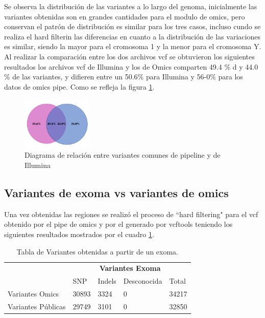 Se observa la distribución de las variantes a lo largo del genoma, inicialmente las variantes obtenidas son en grandes cantidades para el modulo de omics, pero conservan el patrón de distribución es similar para los tres casos, incluso cundo se realiza el hard filterin las diferencias en cuanto a la distribución de las variaciones es similar, siendo la mayor para el cromosoma 1 y la menor para el cromosoma Y. \\

Al realizar la comparación entre los dos archivos vcf se obtuvieron los siguientes resultados los archivos vcf de Illumina y los de Omics comparten 49.4 \% d y 44.0 \% de las variantes, y difieren entre un 50.6\% para Illumina y 56-0\% para los datos de omics pipe. Como se refleja la figura \ref{fig:diagrama}. \\

\begin{figure}[]
	\centering
	\includegraphics[width=0.3\textwidth]{Kap2/validacion2}
	\caption{Diagrama de relación entre variantes comunes de pipeline y de Illumina} \label{fig:diagrama}
\end{figure}

\subsection*{Variantes de exoma vs variantes de omics}

Una vez obtenidas las regiones se realizó el proceso de ``hard filtering" para el vcf obtenido por el pipe de omics y por el generado por vcftools teniendo los siguientes resultados mostrados por el cuadro \ref{tabla:tabla2}. \\

\begin{table}[H]
	\centering  
	\begin{tabular}{|l|l|l|l|l|}
		\hline
		& \multicolumn{4}{c|}{\textbf{Variantes Exoma}} \\
		\cline{2-5} 
		& SNP  & Indels & Desconocida & Total \\ \cline{2-5}
		\hline 
		\multirow{1}{4cm}{Variantes Omics} & 30893 & 3324 & 0 & 34217 \\ \cline{2-5}
		\hline 
		\multirow{1}{4cm}{Variantes Públicas} & 29749 & 3101 & 0 & 32850 \\ \cline{2-5}
		\hline
	\end{tabular}
	\caption{Tabla de Variantes obtenidas a partir de un exoma. }
	\label{tabla:tabla2}
\end{table} 

